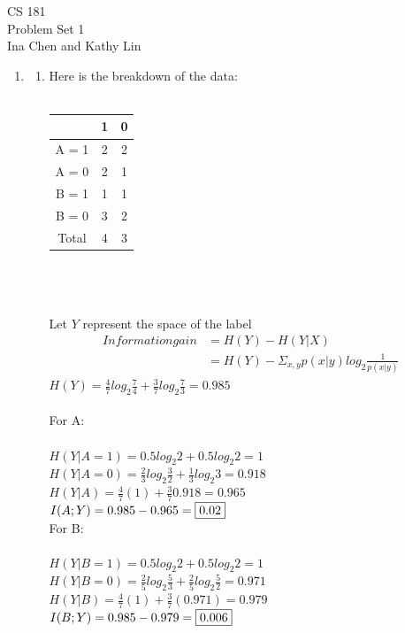 \documentclass[12pt]{article}
\begin{document}
\begin{center}
CS 181\\
Problem Set 1\\
Ina Chen and Kathy Lin
\end{center}

\begin{enumerate}

	\item 
		\begin{enumerate}
			\item Here is the breakdown of the data:\\\\
				\begin{tabular}{|c|c|c|}
        				\hline
        				~            & 1 & 0 \\ \hline
        				A = 1 & 2      & 2      \\ 
        				A = 0 & 2      & 1      \\
        				\hline
        				B = 1 & 1      & 1      \\ 
        				B = 0 & 3      & 2      \\
        				\hline
					Total & 4      & 3      \\
        				\hline
    				\end{tabular}
\\\\\\Let $Y$ represent the space of the label
				\begin{align*}Information gain &= H(Y) - H(Y|X)\\
							& = H(Y) -\Sigma_{x,y}p(x|y)log_{2}\frac{1}{p(x|y)}\end{align*}
				$H(Y) = \frac{4}{7}log_{2}\frac{7}{4} + \frac{3}{7}log_{2}\frac{7}{3} = 0.985$\\\\
				For A:\\\\
				$H(Y|A = 1) = 0.5log_{2}2 + 0.5log_{2}2 = 1$\\
				$H(Y|A = 0) = \frac{2}{3}log_{2}\frac{3}{2} + \frac{1}{3}log_{2}3 = 0.918$\\
				$H(Y|A) = \frac{4}{7}(1) + \frac{3}{7}0.918 = 0.965$\\
				$I(A ; Y) = 0.985 - 0.965 = \fbox{0.02}$\\

				For B:\\\\
				$H(Y|B = 1) = 0.5log_{2}2 + 0.5log_{2}2 = 1$\\
				$H(Y|B = 0) = \frac{2}{5}log_{2}\frac{5}{3} + \frac{2}{5}log_{2}\frac{5}{2} = 0.971$\\
				$H(Y|B) = \frac{4}{7}(1) + \frac{3}{7}(0.971) = 0.979$\\
				$I(B ; Y) = 0.985 - 0.979 = \fbox{0.006}$\\


\end{enumerate}
\end{enumerate}
\end{document}
